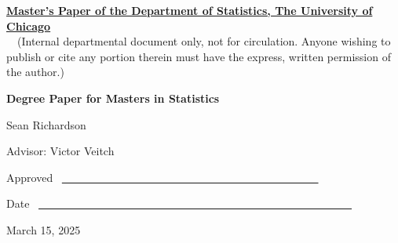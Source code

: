 \documentclass[12pt]{article}
\begin{document}
    \noindent
    \thispagestyle{empty}
    \underline{\bf Master's Paper of the Department of Statistics, The University of Chicago}
    \\~~(Internal departmental document only, not for circulation. Anyone wishing to publish or cite any portion therein must have the express, written permission of the author.)

    \vspace{1.8in}
    \begin{center}
    {\bf\LARGE Degree Paper for Masters in Statistics}

    \vspace{1.4in}
    {\Large Sean Richardson}

    \vspace{1.3in}
    {\Large Advisor: Victor Veitch}

    \end{center}

    \vspace{.6in}
    {\Large Approved} ~\underline{~~~~~~~~~~~~~~~~~~
    ~~~~~~~~~~~~~~~~~~~~~~~~~~~~}

    \vspace{.2in}
    {\Large Date} ~\underline{~~~~~~~~~~~~~~~~~~~~~~~~~~~~~~~~~~~~~~~~~~~~~~~~~~~~~~~~~}

    \vfill
    \begin{center}{\large March 15, 2025}\end{center}
    
\end{document}

